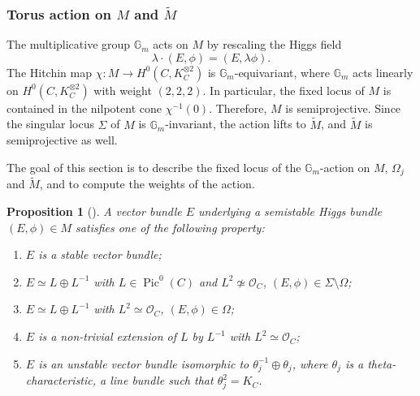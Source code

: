 \documentclass[JEP,XML,SOM,Unicode, NoEqCountersInSection,NoFloatCountersInSection,published]{cedram}
\let\mathcal\mathscr
\newtheorem{prop}[thm]{Proposition}
\theoremstyle{definition}
\newcommand{\Gm}{\mathbb{G}_m}
\newcommand{\Pic}{\operatorname{Pic}}
\begin{document}
\subsubsection{Torus action on $M$ and $\widetilde{M}$}\label{sec:torusaction}
The multiplicative group $\Gm$ acts on $M$ by rescaling the Higgs field\vspace*{-3pt}
\[
\lambda \cdot (E, \phi)=(E, \lambda \phi).
\]
The Hitchin map $\chi\colon M \to H^0(C, K_C^{\otimes 2})$ is $\Gm$\nobreakdash-equivariant, where $\Gm$ acts linearly on $H^0(C, K_C^{\otimes 2})$ with weight $(2,2,2)$. In particular, the fixed locus of $M$ is contained in the nilpotent cone $\chi^{-1}(0)$. Therefore, $M$ is semiprojective. Since the singular locus $\Sigma$ of $M$ is $\Gm$\nobreakdash-invariant, the action lifts to $\widetilde{M}$, and $\widetilde{M}$ is semiprojective as well.

The goal of this section is to describe the fixed locus of the $\Gm$\nobreakdash-action on $M$, $\Omega_j$ and $\widetilde{M}$, and to compute the weights of the action.

\begin{prop}[{\cite[Ex.\,3.13]{Hitchin1987}}]\label{Hitchin:classificationvb}
A vector bundle $E$ underlying a semistable Higgs bundle $(E, \phi) \in M$ satisfies one of the following property:
\begin{enumerate}
\item $E$ is a stable vector bundle;
\item $E \simeq L \oplus L^{-1}$ with $L\in \Pic^0(C)$ and $L^2 \not\simeq \mathcal{O}_C$, \ie $(E, \phi) \in \Sigma \setminus \Omega$;
\item $E \simeq L \oplus L^{-1}$ with $L^2 \simeq \mathcal{O}_C$, \ie $(E, \phi) \in \Omega$;
\item\label{item:nontrivialextension} $E$ is a non-trivial extension of $L$ by $L^{-1}$ with $L^2 \simeq \mathcal{O}_C$;
\item $E$ is an unstable vector bundle isomorphic to $\theta^{-1}_j \oplus \theta_j$, where $\theta_j$ is a theta-characteristic, \ie a line bundle such that $\theta_j^2=K_C$.
\end{enumerate}
\end{prop}
\end{document}
